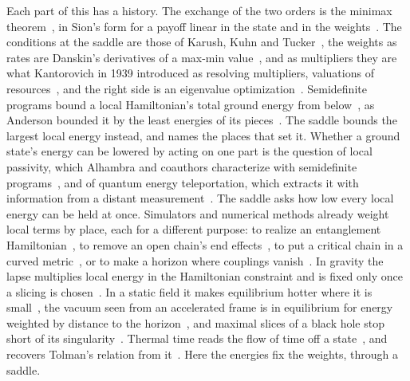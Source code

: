 \documentclass[aps,prd,reprint,superscriptaddress]{revtex4-2}
\begin{document}
Each part of this has a history. The exchange of the two orders is the minimax theorem~\cite{vonNeumann1928}, in Sion's form for a payoff linear in the state and in the weights~\cite{Sion1958}. The conditions at the saddle are those of Karush, Kuhn and Tucker~\cite{GiorgiKjeldsen2014,BoydVandenberghe2004}, the weights as rates are Danskin's derivatives of a max-min value~\cite{Danskin1966}, and as multipliers they are what Kantorovich in 1939 introduced as resolving multipliers, valuations of resources~\cite{Kantorovich1960}, and the right side is an eigenvalue optimization~\cite{Overton1988,LewisOverton1996}. Semidefinite programs bound a local Hamiltonian's total ground energy from below~\cite{BarthelHubener2012,BaumgratzPlenio2012}, as Anderson bounded it by the least energies of its pieces~\cite{Anderson1951}. The saddle bounds the largest local energy instead, and names the places that set it. Whether a ground state's energy can be lowered by acting on one part is the question of local passivity, which Alhambra and coauthors characterize with semidefinite programs~\cite{AlhambraEtAl2019}, and of quantum energy teleportation, which extracts it with information from a distant measurement~\cite{Hotta2011}. The saddle asks how low every local energy can be held at once. Simulators and numerical methods already weight local terms by place, each for a different purpose: to realize an entanglement Hamiltonian~\cite{DalmonteVermerschZoller2018}, to remove an open chain's end effects~\cite{HikiharaNishino2011}, to put a critical chain in a curved metric~\cite{DubailEtAl2017}, or to make a horizon where couplings vanish~\cite{RodriguezLagunaEtAl2017}. In gravity the lapse multiplies local energy in the Hamiltonian constraint and is fixed only once a slicing is chosen~\cite{ArnowittDeserMisner2008,Gourgoulhon2007}. In a static field it makes equilibrium hotter where it is small~\cite{Tolman1930}, the vacuum seen from an accelerated frame is in equilibrium for energy weighted by distance to the horizon~\cite{BisognanoWichmann1976}, and maximal slices of a black hole stop short of its singularity~\cite{EstabrookEtAl1973}. Thermal time reads the flow of time off a state~\cite{ConnesRovelli1994}, and recovers Tolman's relation from it~\cite{RovelliSmerlak2011}. Here the energies fix the weights, through a saddle.
\end{document}
